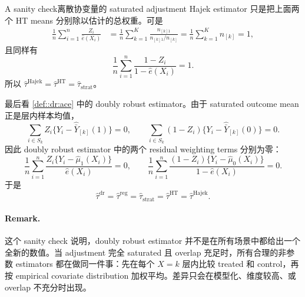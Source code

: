 \begin{exercisesolution}{A sanity check}{离散协变量的 saturated adjustment}
Hajek estimator 只是把上面两个 HT means 分别除以估计的总权重。可是
\begin{align*}
\frac{1}{n}\sum_{i=1}^n\frac{Z_i}{\hat e(X_i)}
&=\frac{1}{n}\sum_{k=1}^K
\frac{n_{[k]1}}{n_{[k]1}/n_{[k]}}
=\frac{1}{n}\sum_{k=1}^K n_{[k]}=1,
\end{align*}
且同样有
\[
\frac{1}{n}\sum_{i=1}^n\frac{1-Z_i}{1-\hat e(X_i)}=1.
\]
所以 $\hat\tau^{\mathrm{Hajek}}=\hat\tau^{\mathrm{HT}}=\hat\tau_{\mathrm{strat}}$。

最后看 \cref{def::dr:ace} 中的 doubly robust estimator。由于 saturated outcome mean 正是层内样本均值，
\[
\sum_{i\in S_k}Z_i\{Y_i-\hat{\bar Y}_{[k]}(1)\}=0,\qquad
\sum_{i\in S_k}(1-Z_i)\{Y_i-\hat{\bar Y}_{[k]}(0)\}=0.
\]
因此 doubly robust estimator 中的两个 residual weighting terms 分别为零：
\[
\frac{1}{n}\sum_{i=1}^n
\frac{Z_i\{Y_i-\hat\mu_1(X_i)\}}{\hat e(X_i)}=0,\qquad
\frac{1}{n}\sum_{i=1}^n
\frac{(1-Z_i)\{Y_i-\hat\mu_0(X_i)\}}{1-\hat e(X_i)}=0.
\]
于是
\[
\hat\tau^{\mathrm{dr}}
=\hat\tau^{\mathrm{reg}}
=\hat\tau_{\mathrm{strat}}
=\hat\tau^{\mathrm{HT}}
=\hat\tau^{\mathrm{Hajek}}.
\]

\paragraph{Remark.}
这个 sanity check 说明，doubly robust estimator 并不是在所有场景中都给出一个全新的数值。当 adjustment 完全 saturated 且 overlap 充足时，所有合理的非参数 estimators 都在做同一件事：先在每个 $X=k$ 层内比较 treated 和 control，再按 empirical covariate distribution 加权平均。差异只会在模型化、维度较高、或 overlap 不充分时出现。
\end{exercisesolution}

